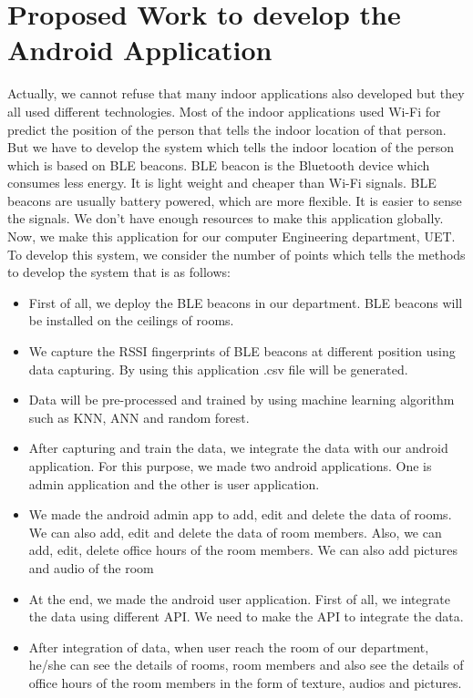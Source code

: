 \section{Proposed Work to develop the Android Application}
Actually, we cannot refuse that many indoor applications also developed but they all used different technologies. Most of the indoor applications used Wi-Fi for predict the position of the person that tells the indoor location of that person. But we have to develop the system which tells the indoor location of the person which is based on BLE beacons. BLE beacon is the Bluetooth device which consumes less energy. It is light weight and cheaper than Wi-Fi signals. BLE beacons are usually battery powered, which are more flexible. It is easier to sense the signals. 
We don’t have enough resources to make this application globally. Now, we make this application for our computer Engineering department, UET. To develop this system, we consider the number of points which tells the methods to develop the system that is as follows:
\begin{itemize}
\item First of all, we deploy the BLE beacons in our department. BLE beacons will be installed on the ceilings of rooms.
\item We capture the RSSI fingerprints of BLE beacons at different position using data capturing. By using this application .csv ﬁle will be generated. 
\item Data will be pre-processed and trained by using machine learning algorithm such as KNN, ANN and random forest.
\item After capturing and train the data, we integrate the data with our android application. For this purpose, we made two android applications. One is admin application and the other is user application.
\item We made the android admin app to add, edit and delete the data of rooms. We can also add, edit and delete the data of room members. Also, we can add, edit, delete office hours of the room members. We can also add pictures and audio of the room
\item At the end, we made the android user application. First of all, we integrate the data using different API. We need to make the API to integrate the data.
\item  After integration of data, when user reach the room of our department, he/she can see the details of rooms, room members and also see the details of  office hours of the room members in the form of texture, audios and pictures.
\end{itemize}
